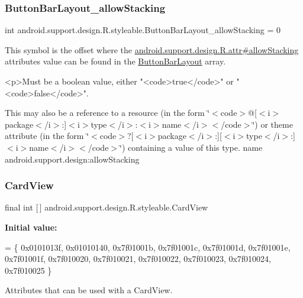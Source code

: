 \subsubsection{\texorpdfstring{Button\+Bar\+Layout\+\_\+allow\+Stacking}{ButtonBarLayout\_allowStacking}}
{\footnotesize\ttfamily int android.\+support.\+design.\+R.\+styleable.\+Button\+Bar\+Layout\+\_\+allow\+Stacking = 0\hspace{0.3cm}{\ttfamily [static]}}

This symbol is the offset where the \hyperlink{classandroid_1_1support_1_1design_1_1R_1_1attr_a12ec14191d9a3072180ffdf038577cae}{android.\+support.\+design.\+R.\+attr\#allow\+Stacking} attribute\textquotesingle{}s value can be found in the \hyperlink{classandroid_1_1support_1_1design_1_1R_1_1styleable_a4f0d1f5f070f55c0bbcd76e065dda963}{Button\+Bar\+Layout} array.

\begin{DoxyVerb}      <p>Must be a boolean value, either "<code>true</code>" or "<code>false</code>".
\end{DoxyVerb}
 

This may also be a reference to a resource (in the form \char`\"{}$<$code$>$@\mbox{[}$<$i$>$package$<$/i$>$\+:\mbox{]}$<$i$>$type$<$/i$>$\+:$<$i$>$name$<$/i$>$$<$/code$>$\char`\"{}) or theme attribute (in the form \char`\"{}$<$code$>$?\mbox{[}$<$i$>$package$<$/i$>$\+:\mbox{]}\mbox{[}$<$i$>$type$<$/i$>$\+:\mbox{]}$<$i$>$name$<$/i$>$$<$/code$>$\char`\"{}) containing a value of this type.  name android.\+support.\+design\+:allow\+Stacking \mbox{\label{classandroid_1_1support_1_1design_1_1R_1_1styleable_a56025691fb136d28dc5fce5a25d7c65e}} 
\subsubsection{\texorpdfstring{Card\+View}{CardView}}
{\footnotesize\ttfamily final int \mbox{[}$\,$\mbox{]} android.\+support.\+design.\+R.\+styleable.\+Card\+View\hspace{0.3cm}{\ttfamily [static]}}

{\bfseries Initial value\+:}
\begin{DoxyCode}
= \{
            0x0101013f, 0x01010140, 0x7f01001b, 0x7f01001c,
            0x7f01001d, 0x7f01001e, 0x7f01001f, 0x7f010020,
            0x7f010021, 0x7f010022, 0x7f010023, 0x7f010024,
            0x7f010025
        \}
\end{DoxyCode}
Attributes that can be used with a Card\+View. 

